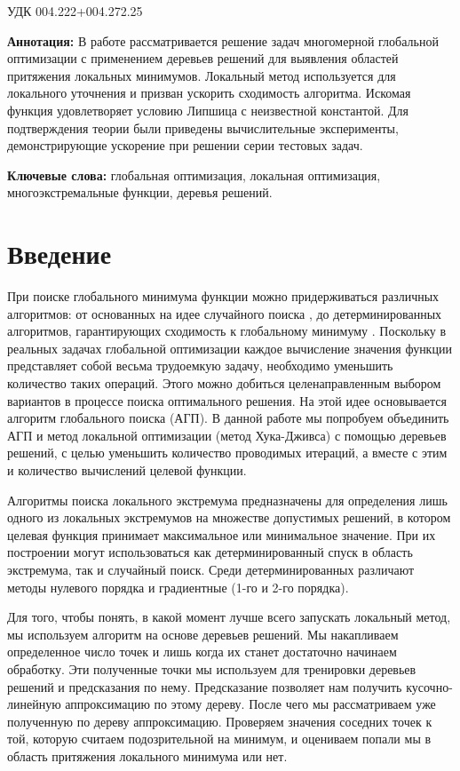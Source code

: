\documentclass[12pt, a4paper, russian]{article}
\begin{document}
УДК 004.222+004.272.25

\vspace{\baselineskip}

\begin{small}
\textbf{Аннотация:} В работе рассматривается решение задач многомерной глобальной оптимизации с применением деревьев решений для выявления областей притяжения локальных минимумов. Локальный метод используется для локального уточнения и призван ускорить сходимость алгоритма. Искомая функция удовлетворяет условию Липшица с неизвестной константой. Для подтверждения теории были приведены вычислительные эксперименты, демонстрирующие ускорение при решении серии тестовых задач.

\textbf{Ключевые слова:} глобальная оптимизация, локальная оптимизация, многоэкстремальные функции, деревья решений.
\end{small}


\section{Введение}

При поиске глобального минимума функции можно придерживаться различных алгоритмов: от основанных на идее случайного поиска \cite{fio_bib1, fio_bib2, fio_bib3}, до детерминированных алгоритмов, гарантирующих сходимость к глобальному минимуму \cite{fio_bib4, fio_bib5, fio_bib6}. Поскольку в реальных задачах глобальной оптимизации каждое вычисление значения функции представляет собой весьма трудоемкую задачу, необходимо уменьшить количество таких операций. Этого можно добиться целенаправленным выбором вариантов в процессе поиска оптимального решения. На этой идее основывается алгоритм глобального поиска (АГП). В данной работе мы попробуем объединить АГП и метод локальной оптимизации (метод Хука-Дживса) с помощью деревьев решений, с целью уменьшить количество проводимых итераций, а вместе с этим и количество вычислений целевой функции.

Алгоритмы поиска локального экстремума предназначены для определения лишь одного из локальных экстремумов на множестве допустимых решений, в котором целевая функция принимает максимальное или минимальное значение. При их построении могут использоваться как детерминированный спуск в область экстремума, так и случайный поиск. Среди детерминированных различают методы нулевого порядка и градиентные (1-го и 2-го порядка).

Для того, чтобы понять, в какой момент лучше всего запускать локальный метод, мы используем алгоритм на основе деревьев решений. Мы накапливаем определенное число точек и лишь когда их станет достаточно начинаем обработку. Эти полученные точки мы используем для тренировки деревьев решений и предсказания по нему. Предсказание позволяет нам получить кусочно-линейную аппроксимацию по этому дереву. После чего мы рассматриваем уже полученную по дереву аппроксимацию. Проверяем значения соседних точек к той, которую считаем подозрительной на минимум, и оцениваем попали мы в область притяжения локального минимума или нет. 
\end{document}
